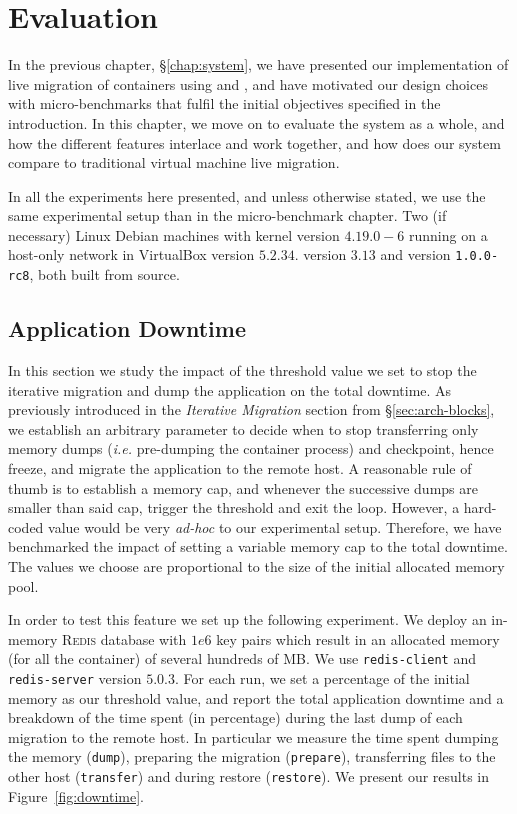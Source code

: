 \chapter{Evaluation} \label{chap:evaluation}

In the previous chapter, \S\ref{chap:system}, we have presented our implementation of live migration of containers using \criu and \runc, and have motivated our design choices with micro-benchmarks that fulfil the initial objectives specified in the introduction.
In this chapter, we move on to evaluate the system as a whole, and how the different features interlace and work together, and  how does our system compare to traditional virtual machine live migration.

In all the experiments here presented, and unless otherwise stated, we use the same experimental setup than in the micro-benchmark chapter.
Two (if necessary) Linux Debian machines with kernel version $4.19.0-6$ running on a host-only network in VirtualBox version $5.2.34$.
\criu version $3.13$ and \runc version \texttt{1.0.0-rc8}, both built from source.

\section{Application Downtime} \label{sec:eval-downtime}

In this section we study the impact of the threshold value we set to stop the iterative migration and dump the application on the total downtime.
As previously introduced in the \textit{Iterative Migration} section from \S\ref{sec:arch-blocks}, we establish an arbitrary parameter to decide when to stop transferring only memory dumps (\textit{i.e.} pre-dumping the container process) and checkpoint, hence freeze, and migrate the application to the remote host.
A reasonable rule of thumb is to establish a memory cap, and whenever the successive dumps are smaller than said cap, trigger the threshold and exit the loop.
However, a hard-coded value would be very \textit{ad-hoc} to our experimental setup.
Therefore, we have benchmarked the impact of setting a variable memory cap to the total downtime.
The values we choose are proportional to the size of the initial allocated memory pool.

In order to test this feature we set up the following experiment.
We deploy an in-memory \textsc{Redis} database with $1e6$ key pairs which result in an allocated memory (for all the container) of several hundreds of MB.
We use \texttt{redis-client} and \texttt{redis-server} version $5.0.3$.
For each run, we set a percentage of the initial memory as our threshold value, and report the total application downtime and a breakdown of the time spent (in percentage) during the last dump of each migration to the remote host.
In particular we measure the time spent dumping the memory (\texttt{dump}), preparing the migration (\texttt{prepare}), transferring files to the other host (\texttt{transfer}) and during restore (\texttt{restore}).
We present our results in Figure~\ref{fig:downtime}.

